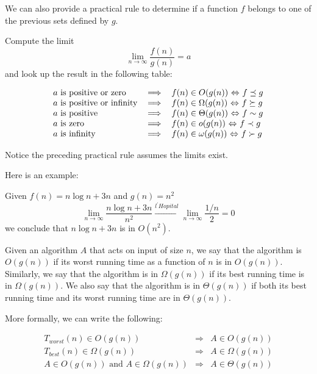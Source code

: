 \documentclass[justified, sixbynine]{tufte-book}
\theoremstyle{plain}%
\newtheorem * {corollary}{Corollary}
\theoremstyle{definition}
\theoremstyle{remark}
\newtheorem * {remark}{Remark}
\newtheorem * {note}{Note}
\begin{document}
\begin{fullwidth}
We can also provide a practical rule to determine if a function $f$ belongs to one of the previous sets defined by $g$.

Compute the limit
\begin{equation}
\lim_{n\rightarrow \infty }\frac{f(n)}{g(n)}=a
\end{equation}
and look up the result in the following table:

\begin{equation}
\begin{tabular}{lll}
$a$ is positive or zero & $\Longrightarrow $ & $f(n)\in O(g(n))$ $%
\Leftrightarrow $ $f\preceq g$ \\
$a$ is positive or infinity & $\Longrightarrow $ & $f(n)\in \Omega (g(n))$ $%
\Leftrightarrow $ $f\succeq g$ \\
$a$ is positive & $\Longrightarrow $ & $f(n)\in \Theta (g(n))$ $%
\Leftrightarrow $ $f\sim g$ \\
$a$ is zero & $\Longrightarrow $ & $f(n)\in o(g(n))$ $\Leftrightarrow $ $%
f\prec g$ \\
$a$ is infinity & $\Longrightarrow $ & $f(n)\in \omega (g(n))$ $%
\Leftrightarrow $ $f\succ g$%
\end{tabular}
\end{equation}

Notice the preceding practical rule assumes the limits exist.

Here is an example:

Given $f(n) = n\log n+3n$ and $g(n) = n^2$
\begin{equation}
\lim_{n\rightarrow \infty }\frac{n\log n+3n}{n^2}\stackrel{l^{\prime }Hopital%
}{\longrightarrow }\lim_{n\rightarrow \infty }\frac{1/n}2=0
\end{equation}
we conclude that $n\log n+3n$ is in $O(n^2)$.

Given an algorithm $A$ that acts on input of size $n$, we say that the algorithm is $O(g(n))$ if its worst running time as a function of $n$ is in $O(g(n))$. Similarly, we say that the algorithm is in $\Omega(g(n))$ if its best running time is in $\Omega(g(n))$. We also say that the algorithm is in $ \Theta(g(n))$ if both its best running time and its worst running time are in  $\Theta(g(n))$.

More formally, we can write the following:

\begin{eqnarray}
T_{worst}(n) \in O(g(n)) &\Rightarrow& A \in O(g(n)) \\
T_{best}(n) \in \Omega(g(n)) &\Rightarrow& A \in \Omega(g(n)) \\
A \in O(g(n)) \textrm{ and } A \in \Omega(g(n))  &\Rightarrow& A \in \Theta(g(n)) \\
\end{eqnarray}


\end{fullwidth}
\end{document}
